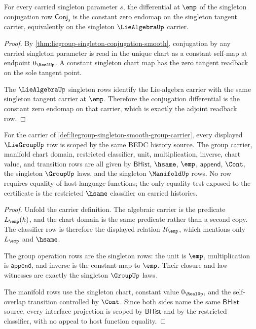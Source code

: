 \begin{theorem}
\label{thm:liegroup-singleton-adjoint-readback}
For every carried singleton parameter $s$, the differential at $\emp$ of the
singleton conjugation row $\mathsf{Conj}_s$ is the constant zero endomap on the
singleton tangent carrier, equivalently on the singleton $\LieAlgebraUp$ carrier.
\end{theorem}
\begin{proof}
By \autoref{thm:liegroup-singleton-conjugation-smooth}, conjugation by any
carried singleton parameter is read in the unique chart as a constant self-map
at endpoint $0_{\RealUp}$. A constant singleton chart map has the zero tangent
readback on the sole tangent point.

The $\LieAlgebraUp$ singleton rows identify the Lie-algebra carrier with the same
singleton tangent carrier at $\emp$. Therefore the conjugation differential is
the constant zero endomap on that carrier, which is exactly the adjoint readback
row.
\end{proof}

\begin{theorem}
\label{thm:liegroup-singleton-shared-source-scope}
For the carrier of
\autoref{def:liegroup-singleton-smooth-group-carrier}, every displayed
$\LieGroupUp$ row is scoped by the same BEDC history source. The group carrier,
manifold chart domain, restricted classifier, unit, multiplication, inverse,
chart value, and transition rows are all given by $\mathsf{BHist}$, $\hsame$,
$\emp$, $\mathsf{append}$, $\Cont$, the singleton $\GroupUp$ laws, and the
singleton $\ManifoldUp$ rows. No row requires equality of host-language
functions; the only equality test exposed to the certificate is the restricted
$\hsame$ classifier on carried histories.
\end{theorem}
\begin{proof}
Unfold the carrier definition. The algebraic carrier is the predicate
$L_{\emp}(h)$, and the chart domain is the same predicate rather than a second
copy. The classifier row is therefore the displayed relation $R_{\emp}$, which
mentions only $L_{\emp}$ and $\hsame$.

The group operation rows are the singleton rows: the unit is $\emp$,
multiplication is $\mathsf{append}$, and inverse is the constant map to $\emp$.
Their closure and law witnesses are exactly the singleton $\GroupUp$ laws.

The manifold rows use the singleton chart, constant value $0_{\RealUp}$, and
the self-overlap transition controlled by $\Cont$. Since both sides name the
same $\mathsf{BHist}$ source, every interface projection is scoped by
$\mathsf{BHist}$ and by the restricted classifier, with no appeal to host
function equality.
\end{proof}

